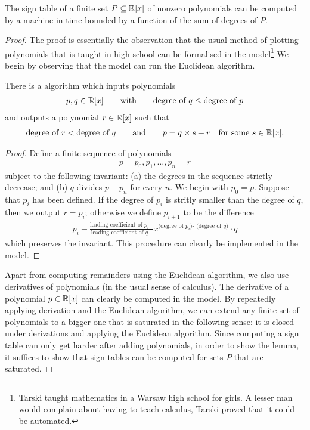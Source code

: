 \begin{lemma}\label{lem:bss-compute-sign-table}
	The sign table of a finite set $P \subseteq \mathbb R[x]$ of nonzero polynomials can be computed by a \bss machine in time bounded by a function of the sum of degrees of $P$.
\end{lemma}
\begin{proof}
The proof is essentially the observation that the usual method of plotting polynomials that is taught in high school can be formalised in the \bss model\footnote{Tarski taught mathematics in a Warsaw  high school for girls. A lesser man would complain about having to teach calculus, Tarski proved that it could be automated.}
We begin by observing that the \bss model can run the Euclidean algorithm.
\begin{claim}
	There is a \bss algorithm which inputs polynomials 
	\begin{align*}
  p,q \in \mathbb R[x] \qquad \text{with} \qquad \text{degree of $q$} \le \text{degree of $p$}
\end{align*}
and  outputs a polynomial $r \in \mathbb R[x]$ such that 
\begin{align*}
\text{degree of $r$} < \text{degree of $q$} \qquad \text{and} \qquad   p = q \times s + r \quad \text{for some $s \in \mathbb R[x]$}.
\end{align*}
\end{claim}
\begin{proof}
Define a finite sequence of polynomials 
\begin{align*}
  p=p_0,p_1,\ldots,p_n=r
\end{align*}
subject to the following  invariant:  (a) the degrees in the sequence strictly decrease; and (b)  $q$ divides  $p-p_n$ for every $n$.  We begin with $p_0 = p$. Suppose that $p_i$ has been defined. If the degree of $p_i$ is stritly smaller than the degree of $q$, then we output $r = p_i$; otherwise we define $p_{i+1}$ to be the difference
	\begin{align*}
    p_i - \frac{\text{leading coefficient of $p_i$ }}{\text{leading coefficient of $q$ }} x^\text{(degree of $p_i$)- (degree of $q$)} \cdot q
\end{align*}
which preserves the invariant.  This procedure can clearly be implemented in the \bss model.
\end{proof}


Apart from computing remainders using the Euclidean algorithm, we  also use derivatives of polynomials (in the usual sense of calculus). 
The derivative of a polynomial $p \in \mathbb R[x]$ can clearly be computed in the \bss model.  By repeatedly applying derivation and the Euclidean algorithm, we can extend any finite set of polynomials to a bigger one that  is saturated in the following sense: it   is closed under derivations and applying the Euclidean algorithm. Since computing a sign table can only get harder after adding polynomials, in order to show the lemma, it suffices to show that sign tables can be computed for sets $P$ that are saturated.


\end{proof}
